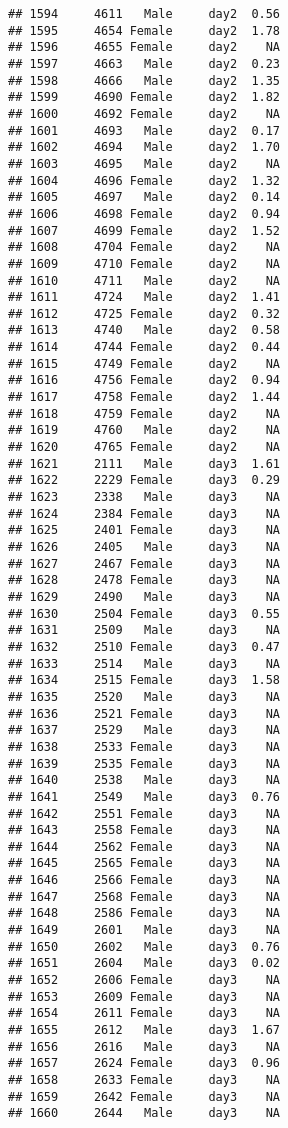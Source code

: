 \documentclass[
]{article}
\begin{document}
\begin{verbatim}
## 1594     4611   Male     day2  0.56
## 1595     4654 Female     day2  1.78
## 1596     4655 Female     day2    NA
## 1597     4663   Male     day2  0.23
## 1598     4666   Male     day2  1.35
## 1599     4690 Female     day2  1.82
## 1600     4692 Female     day2    NA
## 1601     4693   Male     day2  0.17
## 1602     4694   Male     day2  1.70
## 1603     4695   Male     day2    NA
## 1604     4696 Female     day2  1.32
## 1605     4697   Male     day2  0.14
## 1606     4698 Female     day2  0.94
## 1607     4699 Female     day2  1.52
## 1608     4704 Female     day2    NA
## 1609     4710 Female     day2    NA
## 1610     4711   Male     day2    NA
## 1611     4724   Male     day2  1.41
## 1612     4725 Female     day2  0.32
## 1613     4740   Male     day2  0.58
## 1614     4744 Female     day2  0.44
## 1615     4749 Female     day2    NA
## 1616     4756 Female     day2  0.94
## 1617     4758 Female     day2  1.44
## 1618     4759 Female     day2    NA
## 1619     4760   Male     day2    NA
## 1620     4765 Female     day2    NA
## 1621     2111   Male     day3  1.61
## 1622     2229 Female     day3  0.29
## 1623     2338   Male     day3    NA
## 1624     2384 Female     day3    NA
## 1625     2401 Female     day3    NA
## 1626     2405   Male     day3    NA
## 1627     2467 Female     day3    NA
## 1628     2478 Female     day3    NA
## 1629     2490   Male     day3    NA
## 1630     2504 Female     day3  0.55
## 1631     2509   Male     day3    NA
## 1632     2510 Female     day3  0.47
## 1633     2514   Male     day3    NA
## 1634     2515 Female     day3  1.58
## 1635     2520   Male     day3    NA
## 1636     2521 Female     day3    NA
## 1637     2529   Male     day3    NA
## 1638     2533 Female     day3    NA
## 1639     2535 Female     day3    NA
## 1640     2538   Male     day3    NA
## 1641     2549   Male     day3  0.76
## 1642     2551 Female     day3    NA
## 1643     2558 Female     day3    NA
## 1644     2562 Female     day3    NA
## 1645     2565 Female     day3    NA
## 1646     2566 Female     day3    NA
## 1647     2568 Female     day3    NA
## 1648     2586 Female     day3    NA
## 1649     2601   Male     day3    NA
## 1650     2602   Male     day3  0.76
## 1651     2604   Male     day3  0.02
## 1652     2606 Female     day3    NA
## 1653     2609 Female     day3    NA
## 1654     2611 Female     day3    NA
## 1655     2612   Male     day3  1.67
## 1656     2616   Male     day3    NA
## 1657     2624 Female     day3  0.96
## 1658     2633 Female     day3    NA
## 1659     2642 Female     day3    NA
## 1660     2644   Male     day3    NA

\end{verbatim}
\end{document}
